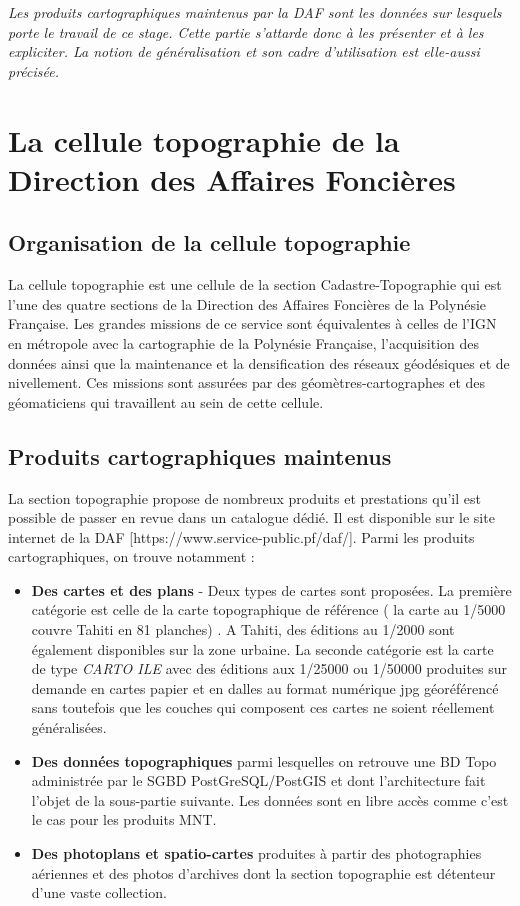 
\textit{Les produits cartographiques maintenus par la DAF sont les données sur lesquels porte le travail de ce stage. Cette partie s'attarde donc à les présenter et à les expliciter. La notion de généralisation et son cadre d'utilisation est elle-aussi précisée.}
 
\section{La cellule topographie de la Direction des Affaires Foncières}

\subsection{Organisation de la cellule topographie}
La cellule topographie est une cellule de la section Cadastre-Topographie qui est l'une des quatre sections de la Direction des Affaires Foncières de la Polynésie Française. Les grandes missions de ce service sont équivalentes à celles de l'IGN en métropole avec la cartographie de la Polynésie Française, l'acquisition des données ainsi que la maintenance et la densification des réseaux géodésiques et de nivellement. Ces missions sont assurées par des géomètres-cartographes et des géomaticiens qui travaillent au sein de cette cellule. 

\subsection{Produits cartographiques maintenus}
La section topographie propose de nombreux produits et prestations qu'il est possible de passer en revue dans un catalogue dédié. Il est disponible sur le site internet de la DAF [https://www.service-public.pf/daf/]. Parmi les produits cartographiques, on trouve notamment :

\begin{itemize}
\item \textbf{Des cartes et des plans } - Deux types de cartes sont proposées. La première catégorie est celle de la carte topographique de référence ( la carte au 1/5000 couvre Tahiti en 81 planches) . A Tahiti, des éditions au 1/2000 sont également disponibles sur la zone urbaine. La seconde catégorie est la carte de type \textit{CARTO ILE} avec des éditions aux 1/25000 ou 1/50000 produites sur demande en cartes papier et en dalles au format numérique jpg géoréférencé sans toutefois que les couches qui composent ces cartes ne soient réellement généralisées.
\item \textbf{Des données topographiques} parmi lesquelles on retrouve une BD Topo administrée par le SGBD PostGreSQL/PostGIS  et dont l'architecture fait l'objet de la sous-partie suivante. Les données sont en libre accès comme c'est le cas pour les produits MNT.
\item \textbf{Des photoplans et spatio-cartes} produites à partir des photographies aériennes et des photos d'archives dont la section topographie est détenteur d'une vaste collection.
\end{itemize}

